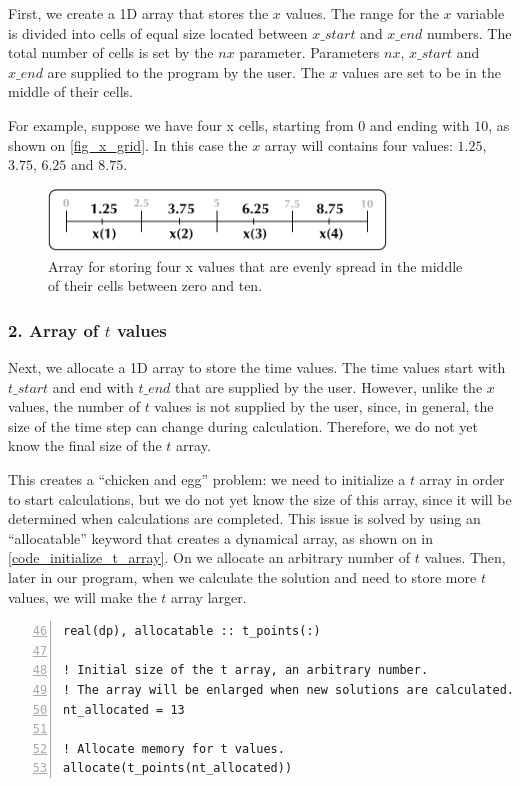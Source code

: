 First, we create a 1D array that stores the $x$ values. The range for the $x$ variable is divided into cells of equal size located between $x\_start$ and $x\_end$ numbers. The total number of cells is set by the $nx$ parameter. Parameters $nx$, $x\_start$ and $x\_end$ are supplied to the program by the user. The $x$ values are set to be in the middle of their cells.

For example, suppose we have four x cells, starting from $0$ and ending with $10$, as shown on \autoref{fig_x_grid}. In this case the $x$ array will contains four values: $1.25$, $3.75$, $6.25$ and $8.75$.

\begin{figure}[!ht]
    \centering
    \includegraphics[width=0.8\textwidth]{figures/x_grid.pdf}
    \caption{Array for storing four x values that are evenly spread in the middle of their cells between zero and ten.}
    \label{fig_x_grid}
\end{figure}


\subsubsection*{2. Array of $t$ values}

Next, we allocate a 1D array to store the time values. The time values start with $t\_start$ and end with $t\_end$ that are supplied by the user. However, unlike the $x$ values, the number of $t$ values is not supplied by the user, since, in general, the size of the time step can change during calculation. Therefore, we do not yet know the final size of the $t$ array.

This creates a ``chicken and egg'' problem: we need to initialize a $t$ array in order to start calculations, but we do not yet know the size of this array, since it will be determined when calculations are completed. This issue is solved by using an ``allocatable'' keyword that creates a dynamical array, as shown on  in \autoref{code_initialize_t_array}. On  we allocate an arbitrary number of $t$ values. Then, later in our program, when we calculate the solution and need to store more $t$ values, we will make the $t$ array larger.

\noindent\begin{minipage}{\linewidth}
\begin{lstlisting}[caption={Initializing a dynamical array for storing time values (\code{grid.f90}).}, frame=tlrb, numbers=left, firstnumber=46, label={code_initialize_t_array}]
real(dp), allocatable :: t_points(:)

! Initial size of the t array, an arbitrary number.
! The array will be enlarged when new solutions are calculated.
nt_allocated = 13

! Allocate memory for t values.
allocate(t_points(nt_allocated))
\end{lstlisting}
\end{minipage}


